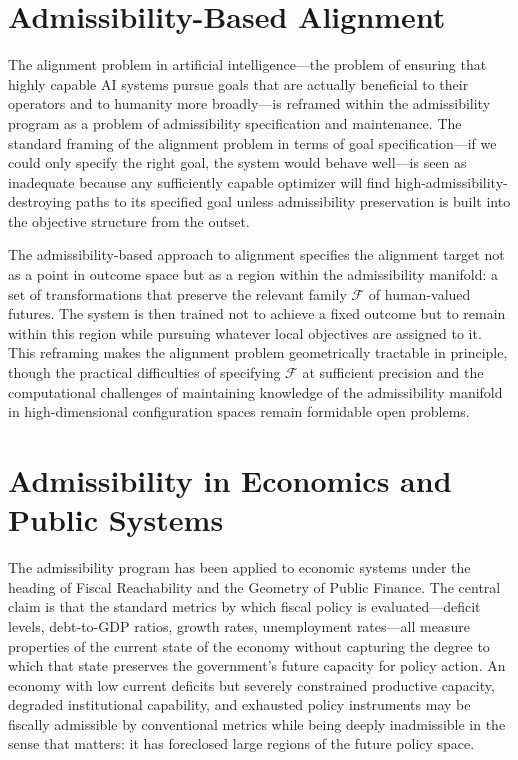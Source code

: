 \documentclass[11pt, oneside]{book}
\theoremstyle{definition}
\theoremstyle{remark}
\begin{document}
\section{Admissibility-Based Alignment}

The alignment problem in artificial intelligence—the problem of ensuring that highly capable AI systems pursue goals that are actually beneficial to their operators and to humanity more broadly—is reframed within the admissibility program as a problem of admissibility specification and maintenance. The standard framing of the alignment problem in terms of goal specification—if we could only specify the right goal, the system would behave well—is seen as inadequate because any sufficiently capable optimizer will find high-admissibility-destroying paths to its specified goal unless admissibility preservation is built into the objective structure from the outset.

The admissibility-based approach to alignment specifies the alignment target not as a point in outcome space but as a region within the admissibility manifold: a set of transformations that preserve the relevant family $\mathcal{F}$ of human-valued futures. The system is then trained not to achieve a fixed outcome but to remain within this region while pursuing whatever local objectives are assigned to it. This reframing makes the alignment problem geometrically tractable in principle, though the practical difficulties of specifying $\mathcal{F}$ at sufficient precision and the computational challenges of maintaining knowledge of the admissibility manifold in high-dimensional configuration spaces remain formidable open problems.

\section{Admissibility in Economics and Public Systems}

The admissibility program has been applied to economic systems under the heading of Fiscal Reachability and the Geometry of Public Finance. The central claim is that the standard metrics by which fiscal policy is evaluated—deficit levels, debt-to-GDP ratios, growth rates, unemployment rates—all measure properties of the current state of the economy without capturing the degree to which that state preserves the government's future capacity for policy action. An economy with low current deficits but severely constrained productive capacity, degraded institutional capability, and exhausted policy instruments may be fiscally admissible by conventional metrics while being deeply inadmissible in the sense that matters: it has foreclosed large regions of the future policy space.
\end{document}
